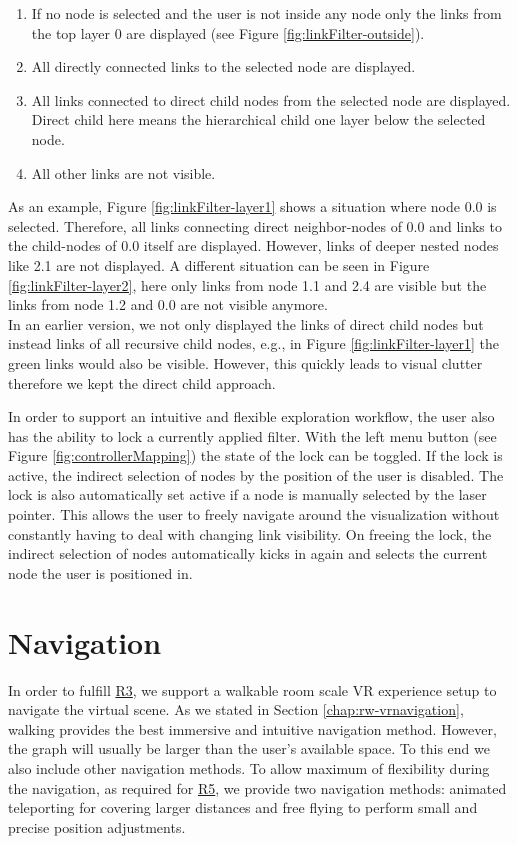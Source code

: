 \begin{enumerate}
    \item If no node is selected and the user is not inside any node only the links from the top layer 0 are displayed (see Figure \ref{fig:linkFilter-outside}).
    \item All directly connected links to the selected node are displayed. 
    \item All links connected to direct child nodes from the selected node are displayed. Direct child here means the hierarchical child one layer below the selected node. 
    \item All other links are not visible.
\end{enumerate}

As an example, Figure \ref{fig:linkFilter-layer1} shows a situation where node 0.0 is selected. Therefore, all links connecting direct neighbor-nodes of 0.0 and links to the child-nodes of 0.0 itself are displayed. However, links of deeper nested nodes like 2.1 are not displayed. 
A different situation can be seen in Figure \ref{fig:linkFilter-layer2}, here only links from node 1.1 and 2.4 are visible but the links from node 1.2 and 0.0 are not visible anymore.\\
In an earlier version, we not only displayed the links of direct child nodes but instead links of all recursive child nodes, e.g., in Figure \ref{fig:linkFilter-layer1} the green links would also be visible. However, this quickly leads to visual clutter therefore we kept the direct child approach.

In order to support an intuitive and flexible exploration workflow, the user also has the ability to lock a currently applied filter.
With the left menu button (see Figure \ref{fig:controllerMapping}) the state of the lock can be toggled. 
If the lock is active, the indirect selection of nodes by the position of the user is disabled. The lock is also automatically set active if a node is manually selected by the laser pointer. 
This allows the user to freely navigate around the visualization without constantly having to deal with changing link visibility. 
On freeing the lock, the indirect selection of nodes automatically kicks in again and selects the current node the user is positioned in.

\section{Navigation}
\label{chap:solution-navigation}
In order to fulfill \hyperref[req:R3]{R3}, we support a walkable room scale VR experience setup to navigate the virtual scene. As we stated in Section \ref{chap:rw-vrnavigation}, walking provides the best immersive and intuitive navigation method.
However, the graph will usually be larger than the user's available space. To this end we also include other navigation methods.
To allow maximum of flexibility during the navigation, as required for \hyperref[req:R5]{R5}, we provide two navigation methods: animated teleporting for covering larger distances and free flying to perform small and precise position adjustments.

